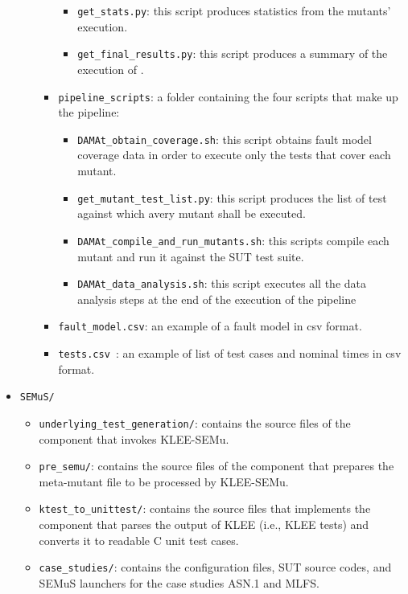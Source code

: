 \begin{itemize}
\begin{itemize}
\begin{itemize}
\begin{itemize}
				\item \texttt{get\_stats.py}: this script produces statistics from the mutants' execution.
				\item \texttt{get\_final\_results.py}: this script produces a summary of the execution of \DAMA.
			\end{itemize}
			\item \texttt{pipeline\_scripts}: a folder containing the four scripts that make up the \DAMA pipeline:
			\begin{itemize}
				\item \texttt{DAMAt\_obtain\_coverage.sh}: this script obtains fault model coverage data in order to execute only the tests that cover each mutant.
				\item \texttt{get\_mutant\_test\_list.py}: this script produces the list of test against which avery mutant shall be executed.
				\item \texttt{DAMAt\_compile\_and\_run\_mutants.sh}: this scripts compile each mutant and run it against the SUT test suite.
				\item \texttt{DAMAt\_data\_analysis.sh}: this script executes all the data analysis steps at the end of the execution of the \DAMA pipeline
			\end{itemize}
			\item \texttt{fault\_model.csv}: an example of a \DAMA fault model in csv format.
			\item \texttt{tests.csv }: an example of list of test cases and nominal times in csv format.
		\end{itemize}
	\end{itemize}
	  \item \texttt{SEMuS/}
    \begin{itemize}
      \item \texttt{underlying\_test\_generation/}: contains the source files of the component that invokes KLEE-SEMu.
      \item \texttt{pre\_semu/}: contains the source files of the component that prepares the meta-mutant file to be processed by KLEE-SEMu.
      \item \texttt{ktest\_to\_unittest/}: contains the source files that implements the component that parses the output of KLEE (i.e., KLEE tests) and converts it to readable C unit test cases.
      \item \texttt{case\_studies/}: contains the configuration files, SUT source codes, and SEMuS launchers for the case studies ASN.1 and MLFS.
      \begin{itemize}

\end{itemize}
\end{itemize}
\end{itemize}
